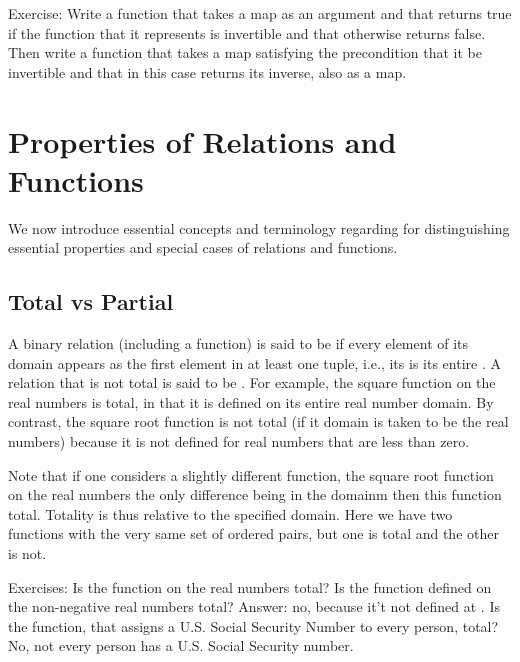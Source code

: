 \documentclass[letterpaper,10pt,english]{sphinxmanual}
\begin{document}
Exercise: Write a function that takes a map as an argument and that
returns true if the function that it represents is invertible and that
otherwise returns false. Then write a function that takes a map
satisfying the precondition that it be invertible and that in this
case returns its inverse, also as a map.


\section{Properties of Relations and Functions}
\label{\detokenize{07-set-theory:properties-of-relations-and-functions}}
We now introduce essential concepts and terminology regarding for
distinguishing essential properties and special cases of relations and
functions.


\subsection{Total vs Partial}
\label{\detokenize{07-set-theory:total-vs-partial}}
A binary relation (including a function) is said to be  if
every element of its domain appears as the first element in at least
one tuple, i.e., its  is its entire .  A relation
that is not total is said to be . For example, the square
function on the real numbers is total, in that it is defined on its
entire real number domain. By contrast, the square root function is
not total (if it domain is taken to be the real numbers) because it is
not defined for real numbers that are less than zero.

Note that if one considers a slightly different function, the square
root function on the  real numbers the only difference
being in the domainm then this function  total. Totality is thus
relative to the specified domain. Here we have two functions with the
very same set of ordered pairs, but one is total and the other is not.

Exercises: Is the function  on the real numbers total?  Is the
 function defined on the non-negative real numbers total? Answer:
no, because it’t not defined at .  Is the  function, that
assigns a U.S. Social Security Number to every person, total? No, not
every person has a U.S. Social Security number.
\end{document}
